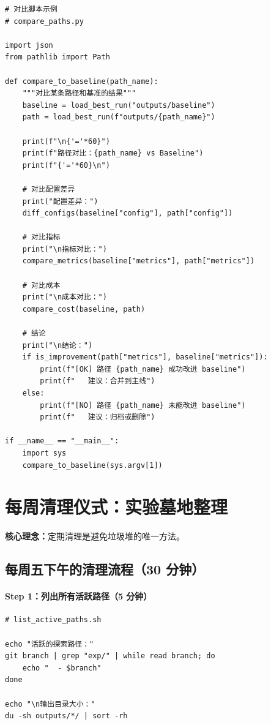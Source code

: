 \begin{verbatim}
# 对比脚本示例
# compare_paths.py

import json
from pathlib import Path

def compare_to_baseline(path_name):
    """对比某条路径和基准的结果"""
    baseline = load_best_run("outputs/baseline")
    path = load_best_run(f"outputs/{path_name}")

    print(f"\n{'='*60}")
    print(f"路径对比：{path_name} vs Baseline")
    print(f"{'='*60}\n")

    # 对比配置差异
    print("配置差异：")
    diff_configs(baseline["config"], path["config"])

    # 对比指标
    print("\n指标对比：")
    compare_metrics(baseline["metrics"], path["metrics"])

    # 对比成本
    print("\n成本对比：")
    compare_cost(baseline, path)

    # 结论
    print("\n结论：")
    if is_improvement(path["metrics"], baseline["metrics"]):
        print(f"[OK] 路径 {path_name} 成功改进 baseline")
        print(f"   建议：合并到主线")
    else:
        print(f"[NO] 路径 {path_name} 未能改进 baseline")
        print(f"   建议：归档或删除")

if __name__ == "__main__":
    import sys
    compare_to_baseline(sys.argv[1])
\end{verbatim}

\section{每周清理仪式：实验墓地整理}

\textbf{核心理念：}定期清理是避免垃圾堆的唯一方法。

\subsection{每周五下午的清理流程（30 分钟）}

\paragraph{Step 1：列出所有活跃路径（5 分钟）}

\begin{verbatim}
# list_active_paths.sh

echo "活跃的探索路径："
git branch | grep "exp/" | while read branch; do
    echo "  - $branch"
done

echo "\n输出目录大小："
du -sh outputs/*/ | sort -rh
\end{verbatim}

